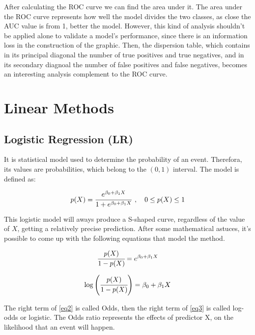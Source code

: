 \documentclass[conference]{IEEEtran}
\begin{document}
After calculating the ROC curve we can find the area under it. The area under the ROC curve
represents how well the model divides the two classes, as close the AUC value is from 1, 
better the model. However, this kind of analysis shouldn't be applied alone to validate
 a model's performance, since there is an information loss in the construction of the 
 graphic. Then, the dispersion table, which contains in its principal diagonal the number
 of true positives and true negatives, and in its secondary diagnoal the number of 
 false positives and false negatives, becomes an interesting analysis complement to the 
 ROC curve.

 \section{Linear Methods}
\subsection{Logistic Regression (LR)}
It is statistical model used to determine the probability of an event. Therefora, its values 
are probabilities, which belong to the $(0,1)$ interval. 
The model is defined as:

\begin{equation}
   p(X) = \cfrac{e^{\beta_0 + \beta_1X}}{1+e^{\beta_0 + \beta_1X}} \hspace{0.15cm}, \hspace{0.35cm} 0\leq p(X) \leq 1 \label{eq1}
\end{equation}

This logistic model will aways produce a S-shaped curve, regardless of the value of $X$, 
getting a relatively precise prediction. After some mathematical astuces, it's possible 
to come up with the following equations that model the method.

\begin{equation}
    \cfrac{p(X)}{1-p(X)} = e^{\beta_0+\beta_1X} \label{eq2}
\end{equation}

\begin{equation}
    \log \left(\cfrac{p(X)}{1-p(X)}\right) = \beta_0+\beta_1X \label{eq3}
\end{equation}

The right term of \eqref{eq2} is called Odds, then the right term of \eqref{eq3} is 
called log-odds or logistic. The Odds ratio represents the effects of predictor X, on the
likelihood that an event will happen.
\end{document}
